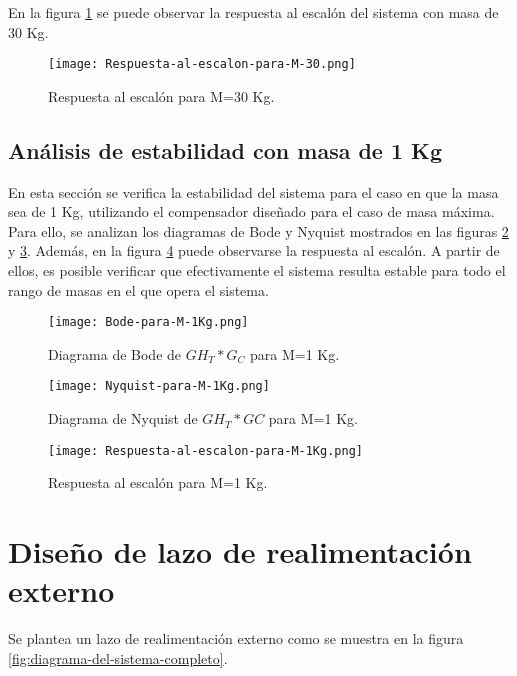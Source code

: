 \noindent En la figura \ref{fig:respuesta-al-escalon-para-M-30} se puede observar la respuesta al escal\'{o}n del sistema con masa de 30 Kg.


\begin{figure}[H]
	\centering
	\texttt{[image: Respuesta-al-escalon-para-M-30.png]}
	\caption{Respuesta al escalón para M=30 Kg.}
	\label{fig:respuesta-al-escalon-para-M-30}
\end{figure}

\subsection{Análisis de estabilidad con masa de 1 Kg}

\noindent En esta secci\'{o}n se verifica la estabilidad del sistema  para el caso en que la masa sea de 1 Kg, utilizando el compensador dise\~{n}ado para el caso de masa m\'{a}xima. Para ello, se analizan los diagramas de Bode y Nyquist mostrados en las figuras \ref{fig:bode-para-M-1Kg} y \ref{fig:nyquist-para-M-1Kg}. Adem\'{a}s, en la figura \ref{fig:respuesta-al-escalon-para-M-1Kg} puede observarse la respuesta al escal\'{o}n. A partir de ellos, es posible verificar que efectivamente el sistema resulta estable para todo el rango de masas en el que opera el sistema. 


\begin{figure}[H]
	\centering
	\texttt{[image: Bode-para-M-1Kg.png]}
	\caption{Diagrama de Bode de $GH_T*G_C$ para M=1 Kg.}
	\label{fig:bode-para-M-1Kg}
\end{figure}

\begin{figure}[H]
	\centering
	\texttt{[image: Nyquist-para-M-1Kg.png]}
	\caption{Diagrama de Nyquist de $GH_T*GC$ para M=1 Kg.}
	\label{fig:nyquist-para-M-1Kg}
\end{figure}

\begin{figure}[H]
	\centering
	\texttt{[image: Respuesta-al-escalon-para-M-1Kg.png]}
	\caption{Respuesta al escalón para M=1 Kg.}
	\label{fig:respuesta-al-escalon-para-M-1Kg}
\end{figure}

\section{Diseño de lazo de realimentación externo}

\noindent Se plantea un lazo de realimentaci\'{o}n externo como se muestra en la  figura \ref{fig:diagrama-del-sistema-completo}.

